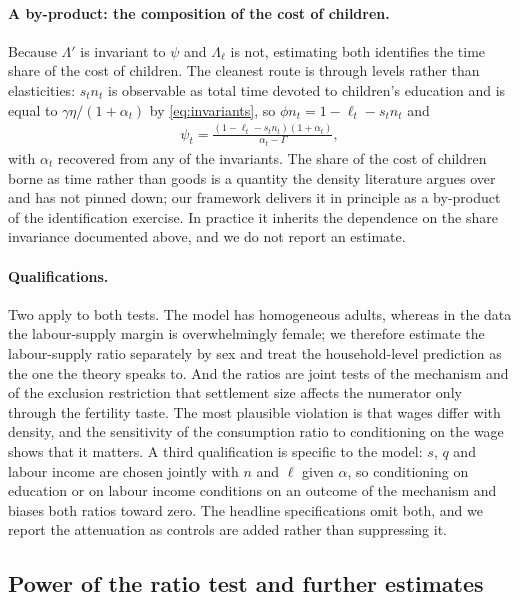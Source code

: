 \documentclass[11pt]{article}
\begin{document}
\paragraph{A by-product: the composition of the cost of children.}
Because $\Lambda'$ is invariant to $\psi$ and $\Lambda_\ell$ is not, estimating both identifies the
time share of the cost of children. The cleanest route is through levels rather than elasticities:
$s_tn_t$ is observable as total time devoted to children's education and is equal to
$\gamma\eta/(1+\alpha_t)$ by \eqref{eq:invariants}, so $\phi n_t=1-\ell_t-s_tn_t$ and
\begin{align}
\psi_t=\frac{\left(1-\ell_t-s_tn_t\right)\left(1+\alpha_t\right)}{\alpha_t-\Gamma},
\label{eq:psi_identified}
\end{align}
with $\alpha_t$ recovered from any of the invariants. The share of the cost of children borne as
time rather than goods is a quantity the density literature argues over and has not pinned down;
our framework delivers it in principle as a by-product of the identification exercise. In practice
it inherits the dependence on the share invariance documented above, and we do not report an
estimate.

\paragraph{Qualifications.}
Two apply to both tests. The model has homogeneous adults, whereas in the data the labour-supply
margin is overwhelmingly female; we therefore estimate the labour-supply ratio separately by sex and
treat the household-level prediction as the one the theory speaks to. And the ratios are joint
tests of the mechanism and of the exclusion restriction that settlement size affects the numerator
only through the fertility taste. The most plausible violation is that wages differ with density, and the sensitivity of the
consumption ratio to conditioning on the wage shows that it matters. A third qualification is
specific to the model: $s$, $q$ and labour income are chosen jointly with $n$ and $\ell$ given
$\alpha$, so conditioning on education or on labour income conditions on an outcome of the
mechanism and biases both ratios toward zero. The headline specifications omit both, and we report
the attenuation as controls are added rather than suppressing it.


\subsection{Power of the ratio test and further estimates}
\label{app:power}
\end{document}
